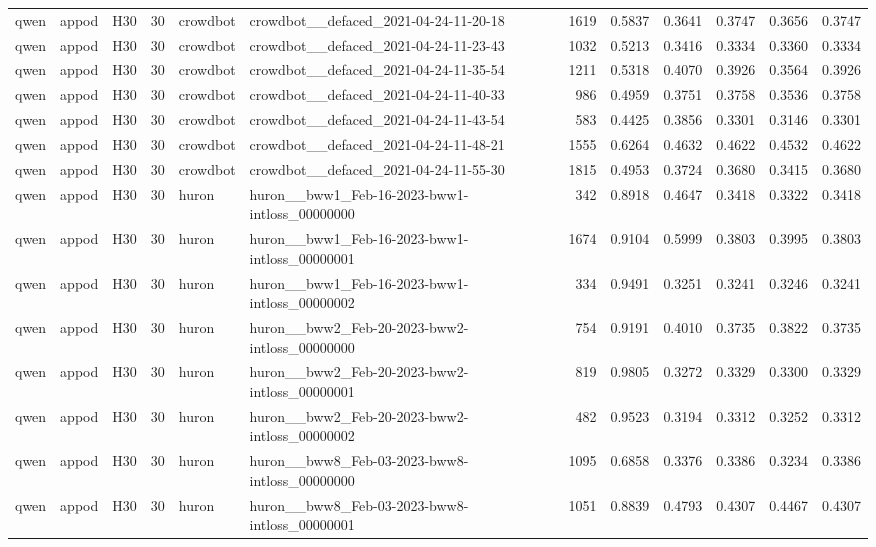 \begin{table}[tbp]
\begin{tabular}{lllrllrrrrrr}
qwen & appod & H30 & 30 & crowdbot & crowdbot\_\_defaced\_2021-04-24-11-20-18 & 1619 & 0.5837 & 0.3641 & 0.3747 & 0.3656 & 0.3747 \\
qwen & appod & H30 & 30 & crowdbot & crowdbot\_\_defaced\_2021-04-24-11-23-43 & 1032 & 0.5213 & 0.3416 & 0.3334 & 0.3360 & 0.3334 \\
qwen & appod & H30 & 30 & crowdbot & crowdbot\_\_defaced\_2021-04-24-11-35-54 & 1211 & 0.5318 & 0.4070 & 0.3926 & 0.3564 & 0.3926 \\
qwen & appod & H30 & 30 & crowdbot & crowdbot\_\_defaced\_2021-04-24-11-40-33 & 986 & 0.4959 & 0.3751 & 0.3758 & 0.3536 & 0.3758 \\
qwen & appod & H30 & 30 & crowdbot & crowdbot\_\_defaced\_2021-04-24-11-43-54 & 583 & 0.4425 & 0.3856 & 0.3301 & 0.3146 & 0.3301 \\
qwen & appod & H30 & 30 & crowdbot & crowdbot\_\_defaced\_2021-04-24-11-48-21 & 1555 & 0.6264 & 0.4632 & 0.4622 & 0.4532 & 0.4622 \\
qwen & appod & H30 & 30 & crowdbot & crowdbot\_\_defaced\_2021-04-24-11-55-30 & 1815 & 0.4953 & 0.3724 & 0.3680 & 0.3415 & 0.3680 \\
qwen & appod & H30 & 30 & huron & huron\_\_bww1\_Feb-16-2023-bww1-intloss\_00000000 & 342 & 0.8918 & 0.4647 & 0.3418 & 0.3322 & 0.3418 \\
qwen & appod & H30 & 30 & huron & huron\_\_bww1\_Feb-16-2023-bww1-intloss\_00000001 & 1674 & 0.9104 & 0.5999 & 0.3803 & 0.3995 & 0.3803 \\
qwen & appod & H30 & 30 & huron & huron\_\_bww1\_Feb-16-2023-bww1-intloss\_00000002 & 334 & 0.9491 & 0.3251 & 0.3241 & 0.3246 & 0.3241 \\
qwen & appod & H30 & 30 & huron & huron\_\_bww2\_Feb-20-2023-bww2-intloss\_00000000 & 754 & 0.9191 & 0.4010 & 0.3735 & 0.3822 & 0.3735 \\
qwen & appod & H30 & 30 & huron & huron\_\_bww2\_Feb-20-2023-bww2-intloss\_00000001 & 819 & 0.9805 & 0.3272 & 0.3329 & 0.3300 & 0.3329 \\
qwen & appod & H30 & 30 & huron & huron\_\_bww2\_Feb-20-2023-bww2-intloss\_00000002 & 482 & 0.9523 & 0.3194 & 0.3312 & 0.3252 & 0.3312 \\
qwen & appod & H30 & 30 & huron & huron\_\_bww8\_Feb-03-2023-bww8-intloss\_00000000 & 1095 & 0.6858 & 0.3376 & 0.3386 & 0.3234 & 0.3386 \\
qwen & appod & H30 & 30 & huron & huron\_\_bww8\_Feb-03-2023-bww8-intloss\_00000001 & 1051 & 0.8839 & 0.4793 & 0.4307 & 0.4467 & 0.4307 \\

\end{tabular}
\end{table}
